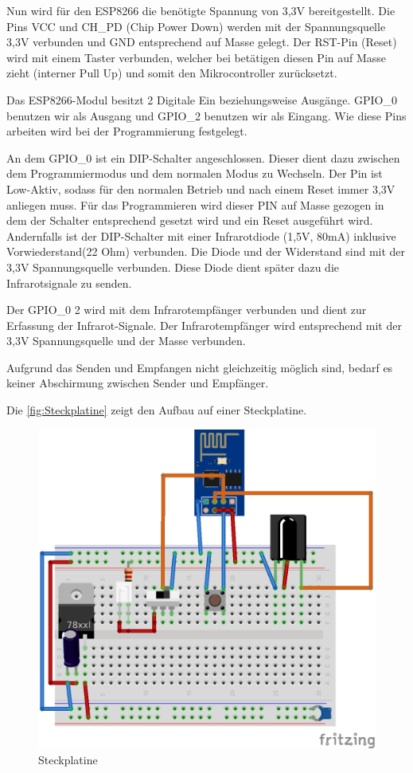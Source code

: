 Nun wird für den ESP8266 die benötigte Spannung von 3,3V bereitgestellt.
Die Pins VCC und CH\_PD (Chip Power Down) werden mit der Spannungsquelle 3,3V verbunden und GND entsprechend auf Masse gelegt.
Der RST-Pin (Reset) wird mit einem Taster verbunden, welcher bei betätigen diesen Pin auf Masse zieht (interner Pull Up) und somit den Mikrocontroller zurücksetzt.

Das ESP8266-Modul besitzt 2 Digitale Ein beziehungsweise Ausgänge. GPIO\_0 benutzen wir als Ausgang und GPIO\_2 benutzen wir als Eingang.
Wie diese Pins arbeiten wird bei der Programmierung festgelegt.

An dem GPIO\_0 ist ein DIP-Schalter angeschlossen.
Dieser dient dazu zwischen dem Programmiermodus und dem normalen Modus zu Wechseln.
Der Pin ist Low-Aktiv, sodass für den normalen Betrieb und nach einem Reset immer 3,3V anliegen muss.
Für das Programmieren wird dieser PIN auf Masse gezogen in dem der Schalter entsprechend gesetzt wird und ein Reset ausgeführt wird.
Andernfalls ist der DIP-Schalter mit einer Infrarotdiode (1,5V, 80mA) inklusive Vorwiederstand(22 Ohm) verbunden.
Die Diode und der Widerstand sind mit der 3,3V Spannungsquelle verbunden.
Diese Diode dient später dazu die Infrarotsignale zu senden.

Der GPIO\_0 2 wird mit dem Infrarotempfänger verbunden und dient zur Erfassung der Infrarot-Signale.
Der Infrarotempfänger wird entsprechend mit der 3,3V Spannungsquelle und der Masse verbunden.

Aufgrund das Senden und Empfangen nicht gleichzeitig möglich sind, bedarf es keiner Abschirmung zwischen Sender und Empfänger.

Die \autoref{fig:Steckplatine} zeigt den Aufbau auf einer Steckplatine.

\begin{figure}
	\centering
	\includegraphics[scale=1]{Abbildungen/ESP8266_Steckplatine}
	\caption{Steckplatine}
	\label{fig:Steckplatine}
\end{figure}


